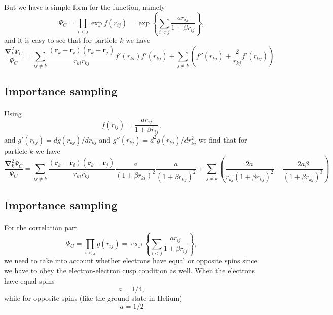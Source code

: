 \documentclass[%
twoside,                 %
final,                   %
10pt]{article}
\begin{document}
{{{{{{\paragraph{}
But we have a simple form for the function, namely
\[
\Psi_{C}=\prod_{i< j}\exp{f(r_{ij})}= \exp{\left\{\sum_{i<j}\frac{ar_{ij}}{1+\beta r_{ij}}\right\}},
\]
and it is easy to see that for particle  $k$
we have
\[
  \frac{\mathbf{\nabla}^2_k \Psi_C}{\Psi_C }=
\sum_{ij\ne k}\frac{(\mathbf{r}_k-\mathbf{r}_i)(\mathbf{r}_k-\mathbf{r}_j)}{r_{ki}r_{kj}}f'(r_{ki})f'(r_{kj})+
\sum_{j\ne k}\left( f''(r_{kj})+\frac{2}{r_{kj}}f'(r_{kj})\right)
\]




\subsection{Importance sampling}

\paragraph{}
Using 
\[
f(r_{ij})= \frac{ar_{ij}}{1+\beta r_{ij}},
\]
and $g'(r_{kj})=dg(r_{kj})/dr_{kj}$ and 
$g''(r_{kj})=d^2g(r_{kj})/dr_{kj}^2$  we find that for particle  $k$
we have
\[
  \frac{\mathbf{\nabla}^2_k \Psi_C}{\Psi_C }=
\sum_{ij\ne k}\frac{(\mathbf{r}_k-\mathbf{r}_i)(\mathbf{r}_k-\mathbf{r}_j)}{r_{ki}r_{kj}}\frac{a}{(1+\beta r_{ki})^2}
\frac{a}{(1+\beta r_{kj})^2}+
\sum_{j\ne k}\left(\frac{2a}{r_{kj}(1+\beta r_{kj})^2}-\frac{2a\beta}{(1+\beta r_{kj})^3}\right)
\]




\subsection{Importance sampling}

\paragraph{}
For the correlation part 
\[
\Psi_C=\prod_{i< j}g(r_{ij})= \exp{\left\{\sum_{i<j}\frac{ar_{ij}}{1+\beta r_{ij}}\right\}},
\]
we need to take into account whether electrons have equal or opposite spins since we have to obey the
electron-electron cusp condition as well.  
When the electrons have  equal spins 
\[
a= 1/4,
\]
while for opposite spins (like the ground state in Helium)
\[
a= 1/2
\]




}}}}}}
\end{document}
